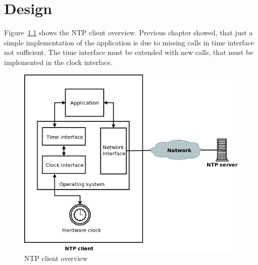 
\chapter{Design}
Figure~\ref{fig:design-overview} shows the NTP client overview.
Previous chapter showed, that just a simple implementation of the application
is due to missing calls in time interface not sufficient.
The time interface must be extended with new calls,
that must be implemented in the clock interface.

\begin{figure}[H]
  \centering
  \includegraphics[width=13cm,keepaspectratio]{fig/design.png}
  \caption{NTP client overview} %
  \label{fig:design-overview} %
\end{figure}









%
